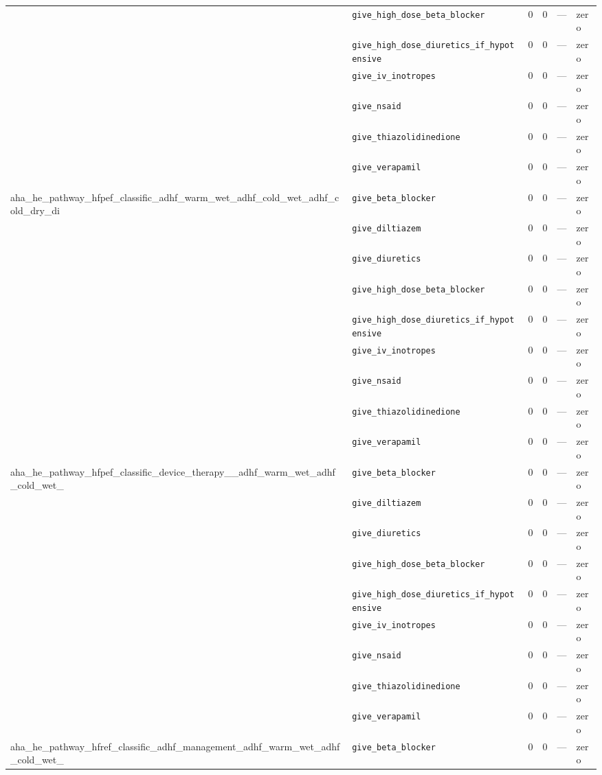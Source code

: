 \begin{table}[ht]
\begin{tabular}{llrrrl}
 & \texttt{give\_high\_dose\_beta\_blocker} & 0 & 0 & — & zero \\
 & \texttt{give\_high\_dose\_diuretics\_if\_hypotensive} & 0 & 0 & — & zero \\
 & \texttt{give\_iv\_inotropes} & 0 & 0 & — & zero \\
 & \texttt{give\_nsaid} & 0 & 0 & — & zero \\
 & \texttt{give\_thiazolidinedione} & 0 & 0 & — & zero \\
 & \texttt{give\_verapamil} & 0 & 0 & — & zero \\
\midrule
aha\_he\_pathway\_hfpef\_classific\_adhf\_warm\_wet\_adhf\_cold\_wet\_adhf\_cold\_dry\_di & \texttt{give\_beta\_blocker} & 0 & 0 & — & zero \\
 & \texttt{give\_diltiazem} & 0 & 0 & — & zero \\
 & \texttt{give\_diuretics} & 0 & 0 & — & zero \\
 & \texttt{give\_high\_dose\_beta\_blocker} & 0 & 0 & — & zero \\
 & \texttt{give\_high\_dose\_diuretics\_if\_hypotensive} & 0 & 0 & — & zero \\
 & \texttt{give\_iv\_inotropes} & 0 & 0 & — & zero \\
 & \texttt{give\_nsaid} & 0 & 0 & — & zero \\
 & \texttt{give\_thiazolidinedione} & 0 & 0 & — & zero \\
 & \texttt{give\_verapamil} & 0 & 0 & — & zero \\
\midrule
aha\_he\_pathway\_hfpef\_classific\_device\_therapy\_\_adhf\_warm\_wet\_adhf\_cold\_wet\_ & \texttt{give\_beta\_blocker} & 0 & 0 & — & zero \\
 & \texttt{give\_diltiazem} & 0 & 0 & — & zero \\
 & \texttt{give\_diuretics} & 0 & 0 & — & zero \\
 & \texttt{give\_high\_dose\_beta\_blocker} & 0 & 0 & — & zero \\
 & \texttt{give\_high\_dose\_diuretics\_if\_hypotensive} & 0 & 0 & — & zero \\
 & \texttt{give\_iv\_inotropes} & 0 & 0 & — & zero \\
 & \texttt{give\_nsaid} & 0 & 0 & — & zero \\
 & \texttt{give\_thiazolidinedione} & 0 & 0 & — & zero \\
 & \texttt{give\_verapamil} & 0 & 0 & — & zero \\
\midrule
aha\_he\_pathway\_hfref\_classific\_adhf\_management\_adhf\_warm\_wet\_adhf\_cold\_wet\_ & \texttt{give\_beta\_blocker} & 0 & 0 & — & zero \\

\end{tabular}
\end{table}
